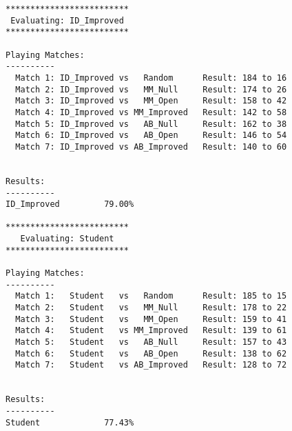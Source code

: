 \documentclass[10pt, a4paper]{article}
\begin{document}
\begin{verbatim}
*************************
 Evaluating: ID_Improved 
*************************

Playing Matches:
----------
  Match 1: ID_Improved vs   Random    	Result: 184 to 16
  Match 2: ID_Improved vs   MM_Null   	Result: 174 to 26
  Match 3: ID_Improved vs   MM_Open   	Result: 158 to 42
  Match 4: ID_Improved vs MM_Improved 	Result: 142 to 58
  Match 5: ID_Improved vs   AB_Null   	Result: 162 to 38
  Match 6: ID_Improved vs   AB_Open   	Result: 146 to 54
  Match 7: ID_Improved vs AB_Improved 	Result: 140 to 60


Results:
----------
ID_Improved         79.00%

*************************
   Evaluating: Student   
*************************

Playing Matches:
----------
  Match 1:   Student   vs   Random    	Result: 185 to 15
  Match 2:   Student   vs   MM_Null   	Result: 178 to 22
  Match 3:   Student   vs   MM_Open   	Result: 159 to 41
  Match 4:   Student   vs MM_Improved 	Result: 139 to 61
  Match 5:   Student   vs   AB_Null   	Result: 157 to 43
  Match 6:   Student   vs   AB_Open   	Result: 138 to 62
  Match 7:   Student   vs AB_Improved 	Result: 128 to 72


Results:
----------
Student             77.43%
\end{verbatim}
\end{document}
